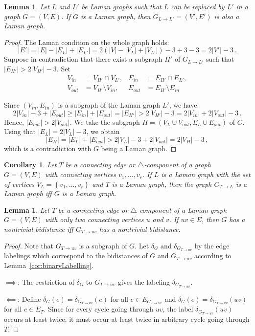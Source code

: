 \documentclass[a4paper, 11pt]{article}
\newcommand{\trcomp}{$\triangle$-component}
\newtheorem{lem}[thm]{Lemma}
\newtheorem{cor}[thm]{Corollary}
\theoremstyle{definition}
\begin{document}
\begin{lem}
Let $L$ and $L'$ be Laman graphs such that $L$ can be replaced by $L'$ in a graph $G=(V,E)$. If $G$ is a Laman graph, then $G_{L\rightarrow L'}=(V',E')$ is also a Laman graph. 
\end{lem}
\begin{proof}
The Laman condition on the whole graph holds:
$$
|E'|=|E|- |E_{L}|+ |E_{L'}|=2(|V|- |V_{L}|+ |V_{L'}|)-3+3-3=2|V'|-3\,.
$$
Suppose in contradiction that there exist a subgraph $H'$ of $G_{L\rightarrow L'}$ such that $|E_{H'}|> 2|V_{H'}|-3$. Set 
\begin{align*}
 V_{in}&=V_{H'}\cap V_{L'}, &E_{in}&=E_{H'}\cap E_{L'}, \\
 V_{out}&=V_{H'} \setminus V_{in}, & E_{out}&=E_{H'} \setminus E_{in}
\end{align*}

Since $(V_{in}, E_{in})$ is a subgraph of the Laman graph $L'$, we have
$$
2|V_{in}|-3 +|E_{out}|\geq  |E_{in}|+|E_{out}|=|E_{H'}|> 2|V_{{H'}}|-3=2|V_{in}|+2|V_{out}|-3\,.
$$
Hence, $|E_{out}|>2|V_{out}|$. We take the subgraph $H=(V_L \cup V_{out}, E_L \cup E_{out})$ of $G$. Using that $|E_L|=2|V_L|-3$, we obtain
$$|E_H|=|E_L|+|E_{out}|>2|V_L|-3+2|V_{out}|=2|V_H|-3\,,$$
which is  a contradiction with $G$ being a  Laman graph.
\end{proof}

\begin{cor}
\label{cor:replaceTrcompByLaman}
Let $T$ be a connecting edge or \trcomp{} of a graph $G=(V,E)$ with connecting vertices $v_1, \dots, v_r$. If $L$ is a Laman graph with the set of vertices $V_L=\left\{v_1, \dots, v_r\right\}$ and $T$ is a Laman graph, then the graph $G_{T\rightarrow L}$ is a Laman graph iff $G$ is a Laman graph.
\end{cor}

\begin{lem}
\label{lem:trcompToEdge}
Let $T$ be a connecting edge or \trcomp{} of a Laman graph $G=(V,E)$ with only two connecting vertices $u$ and $v$. If $uv\in E$, then $G$ has a nontrivial bidistance iff $G_{T\rightarrow uv}$ has a nontrivial bidistance.
\end{lem}
\begin{proof}
Note that $G_{T\rightarrow uv}$ is a subgraph of $G$. Let $\delta_G$ and $\delta_{G_{T\rightarrow uv}}$ by the edge labelings which correspond to the bidistances of $G$ and $G_{T\rightarrow uv}$ according to Lemma~\ref{cor:binaryLabelling}.

$\implies$: The restriction of $\delta_G$ to  $G_{T\rightarrow uv}$ gives the labeling $\delta_{G_{T\rightarrow uv}}$.

$\impliedby$: Define $\delta_G(e)=\delta_{G_{T\rightarrow uv}}(e)$ for all $e\in E_{G_{T\rightarrow uv}}$ and $\delta_G(e)=\delta_{G_{T\rightarrow uv}}(uv)$ for all $e\in E_T$. Since for every cycle going through $uv$, the label $\delta_{G_{T\rightarrow uv}}(uv)$ occurs at least twice, it must occur at least twice in arbitrary cycle going  through $T$.
\end{proof}
\end{document}
